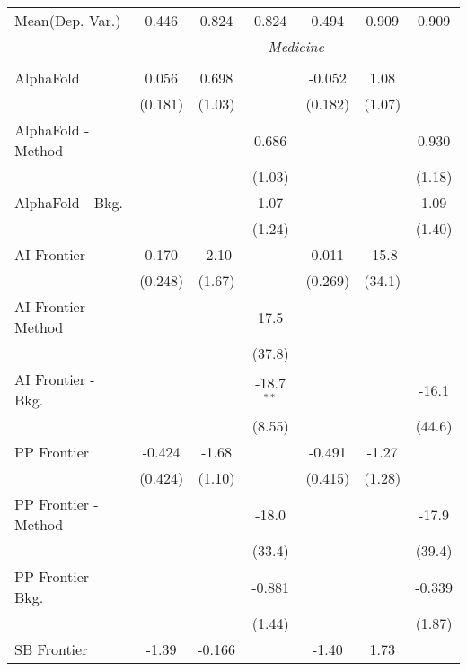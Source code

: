 \begin{tabular}{lcccccc}
Mean(Dep. Var.) & 0.446 & 0.824 & 0.824 & 0.494 & 0.909 & 0.909 \\
 & \multicolumn{6}{c}{\textit{Medicine}} \\ \\
   AlphaFold            & 0.056   & 0.698  &              & -0.052  & 1.08   &   \\   
                        & (0.181) & (1.03) &              & (0.182) & (1.07) &   \\   
   AlphaFold - Method   &         &        & 0.686        &         &        & 0.930\\   
                        &         &        & (1.03)       &         &        & (1.18)\\   
   AlphaFold - Bkg.     &         &        & 1.07         &         &        & 1.09\\   
                        &         &        & (1.24)       &         &        & (1.40)\\   
   AI Frontier          & 0.170   & -2.10  &              & 0.011   & -15.8  &   \\   
                        & (0.248) & (1.67) &              & (0.269) & (34.1) &   \\   
   AI Frontier - Method &         &        & 17.5         &         &        &   \\   
                        &         &        & (37.8)       &         &        &   \\   
   AI Frontier - Bkg.   &         &        & -18.7$^{**}$ &         &        & -16.1\\   
                        &         &        & (8.55)       &         &        & (44.6)\\   
   PP Frontier          & -0.424  & -1.68  &              & -0.491  & -1.27  &   \\   
                        & (0.424) & (1.10) &              & (0.415) & (1.28) &   \\   
   PP Frontier - Method &         &        & -18.0        &         &        & -17.9\\   
                        &         &        & (33.4)       &         &        & (39.4)\\   
   PP Frontier - Bkg.   &         &        & -0.881       &         &        & -0.339\\   
                        &         &        & (1.44)       &         &        & (1.87)\\   
   SB Frontier          & -1.39   & -0.166 &              & -1.40   & 1.73   &   \\   

\end{tabular}
